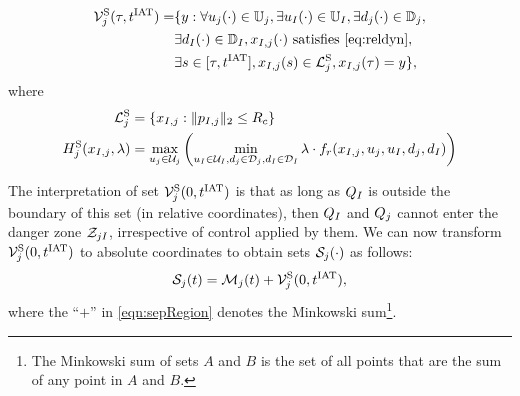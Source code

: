 \begin{equation} \label{eqn:sepBRS}
\begin{aligned}
\brs^{\text{S}}_{j}(\tau, \iat) = & \{y: \forall \ctrl_j(\cdot) \in \cfset_j, \exists \ctrl_\intr(\cdot) \in \cfset_\intr, \exists \dstb_j(\cdot) \in \dfset_j, \\
& \exists \dstb_\intr(\cdot) \in \dfset_\intr, \state_{\intr, j}(\cdot) \text{ satisfies \eqref{eq:reldyn}},\\
& \exists s \in [\tau, \iat], \state_{\intr, j}(s) \in \targetset^{\text{S}}_{j}, \state_{\intr, j}(\tau) = y\},
\end{aligned}
\end{equation}
where 
\begin{equation}
\begin{aligned}
\mathcal{L}^{\text{S}}_{j} &= \{x_{I, j}: \|p_{I, j}\|_2 \le R_c\} \\
H^{\text{S}}_{j}(x_{I, j}, \lambda) &= \max_{u_j \in \mathcal{U}_j} \left( \min_{u_I \in \mathcal{U}_I, d_j \in \mathcal{D}_j, d_I \in \mathcal{D}_I} \lambda \cdot f_r(x_{I, j}, u_j, u_I, d_j, d_I) \right)
\end{aligned}
\end{equation}

The interpretation of set $\mathcal{V}^{\text{S}}_{j}(0, t^\text{IAT})$ is that as long as $Q_{I}$ is outside the boundary of this set (in relative coordinates), then $Q_{I}$ and $Q_{j}$ cannot enter the danger zone $\mathcal{Z}_{jI}$, irrespective of control applied by them.  We can now transform $\mathcal{V}^{\text{S}}_{j}(0, t^\text{IAT})$ to absolute coordinates to obtain sets $\mathcal{S}_j(\cdot)$ as follows:
\begin{equation} \label{eqn:sepRegion}
\sep_j(t) = \boset_j(t) + \brs^{\text{S}}_{j}(0, \iat),
\end{equation}
where the ``$+$'' in \eqref{eqn:sepRegion} denotes the Minkowski sum\footnote{The Minkowski sum of sets $A$ and $B$ is the set of all points that are the sum of any point in $A$ and $B$.}.